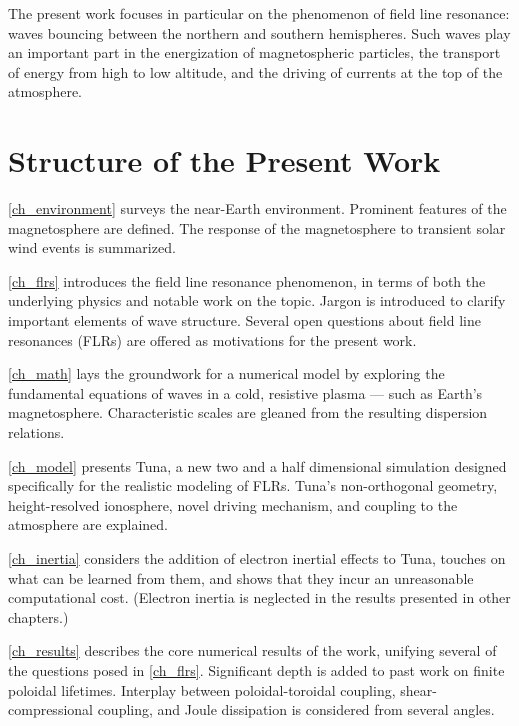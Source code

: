 The present work focuses in particular on the phenomenon of field line resonance: \Alfven waves bouncing between the northern and southern hemispheres. Such waves play an important part in the energization of magnetospheric particles, the transport of energy from high to low altitude, and the driving of currents at the top of the atmosphere. 







\section{Structure of the Present Work}

\cref{ch_environment} surveys the near-Earth environment. Prominent features of the magnetosphere are defined. The response of the magnetosphere to transient solar wind events is summarized. 

\cref{ch_flrs} introduces the field line resonance phenomenon, in terms of both the underlying physics and notable work on the topic. Jargon is introduced to clarify important elements of wave structure. Several open questions about field line resonances (FLRs) are offered as motivations for the present work. 

\cref{ch_math} lays the groundwork for a numerical model by exploring the fundamental equations of waves in a cold, resistive plasma --- such as Earth's magnetosphere. Characteristic scales are gleaned from the resulting dispersion relations. 

\cref{ch_model} presents Tuna, a new two and a half dimensional simulation designed specifically for the realistic modeling of FLRs. Tuna's non-orthogonal geometry, height-resolved ionosphere, novel driving mechanism, and coupling to the atmosphere are explained. 

\cref{ch_inertia} considers the addition of electron inertial effects to Tuna, touches on what can be learned from them, and shows that they incur an unreasonable computational cost. (Electron inertia is neglected in the results presented in other chapters.)

\cref{ch_results} describes the core numerical results of the work, unifying several of the questions posed in \cref{ch_flrs}. Significant depth is added to past work on finite poloidal lifetimes\cite{mann_1995,radoski_1974}. Interplay between poloidal-toroidal coupling, shear-compressional coupling, and Joule dissipation is considered from several angles. 

